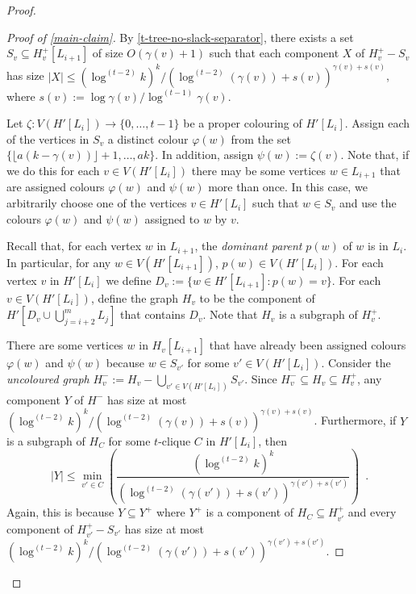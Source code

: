 \documentclass[kpfonts]{patmorin}
\theoremstyle{named}
\begin{document}
\begin{proof}
\begin{proof}[Proof of \cref{main-claim}]

       By \cref{t-tree-no-slack-separator}, there exists a set $S_v\subseteq H^+_v[L_{i+1}]$ of size $O(\gamma(v)+1)$ such that each component $X$ of $H^+_v-S_v$ has size $|X|\le (\log^{(t-2)} k)^k/(\log^{(t-2)} (\gamma(v))+s(v))^{\gamma(v)+s(v)}$, where $s(v):=\log\gamma(v)/\log^{(t-1)}\gamma(v)$.

       Let $\zeta:V(H'[L_i])\to\{0,\ldots,t-1\}$ be a proper colouring of $H'[L_i]$.  Assign each of the vertices in $S_v$ a distinct colour $\varphi(w)$ from the set $\{\lfloor a(k-\gamma(v))\rfloor+1,\ldots,ak\}$.  In addition, assign $\psi(w):=\zeta(v)$.  Note that, if we do this for each $v\in V(H'[L_i])$ there may be some vertices $w\in L_{i+1}$ that are assigned colours $\varphi(w)$ and $\psi(w)$ more than once.  In this case, we arbitrarily choose one of the vertices $v\in H'[L_i]$ such that $w\in S_v$ and use the colours $\varphi(w)$ and $\psi(w)$ assigned to $w$ by $v$.

       Recall that, for each vertex $w$ in $L_{i+1}$, the \emph{dominant parent} $p(w)$ of $w$ is in $L_i$.  In particular, for any $w\in V(H'[L_{i+1}])$, $p(w)\in V(H'[L_{i}])$.
       For each vertex $v$ in $H'[L_i]$ we define $D_v:=\{w\in H'[L_{i+1}]: p(w)=v\}$.  For each $v\in V(H'[L_i])$, define the graph $H_v$ to be the component of $H'[D_v\cup \bigcup_{j=i+2}^m L_j]$ that contains $D_v$.  Note that $H_v$ is a subgraph of $H^+_v$.

       There are some vertices $w$ in $H_v[L_{i+1}]$ that have already been assigned colours $\varphi(w)$ and $\psi(w)$ because $w\in S_{v'}$ for some $v'\in V(H'[L_i])$.  Consider the \emph{uncoloured graph} $H^-_v:=H_v-\bigcup_{v'\in V(H'[L_i])} S_{v'}$.  Since $H^-_v\subseteq H_v\subseteq H^+_v$, any component $Y$ of $H^-$ has size at most $(\log^{(t-2)} k)^k/(\log^{(t-2)} (\gamma(v))+s(v))^{\gamma(v)+s(v)}$.  Furthermore, if $Y$ is a subgraph of $H_C$ for some $t$-clique $C$ in $H'[L_i]$, then
       \begin{equation}
        |Y| \le \min_{v'\in C}\left(\frac{(\log^{(t-2)}k)^k}{(\log^{(t-2)} (\gamma(v'))+s(v'))^{\gamma(v')+s(v')}} \right) \enspace . \label{min}
        \end{equation}
       Again, this is because $Y\subseteq Y^+$ where $Y^+$ is a component of $H_C\subseteq H^+_{v'}$ and every component of $H^+_{v'}-S_{v'}$ has size at most $(\log^{(t-2)}k)^k/(\log^{(t-2)} (\gamma(v'))+s(v'))^{\gamma(v')+s(v')}$.


\end{proof}
\end{proof}
\end{document}
